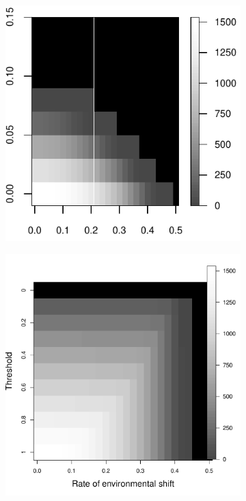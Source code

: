\documentclass[12pt,english]{article}
\begin{document}
\begin{spacing}{1.9}
\begin{figure}[htbp]

\begin{subfigure}{.33\textwidth}
\subcaption{}
\includegraphics[width=\textwidth]{plots/eqbiomass_sim.pdf}
\label{nomang}
\end{subfigure}
\begin{subfigure}{.33\textwidth}
\subcaption{}
\includegraphics[width=\textwidth]{plots/eqbiomass_thresh.pdf}

\end{subfigure}
\end{figure}
\end{spacing}
\end{document}
